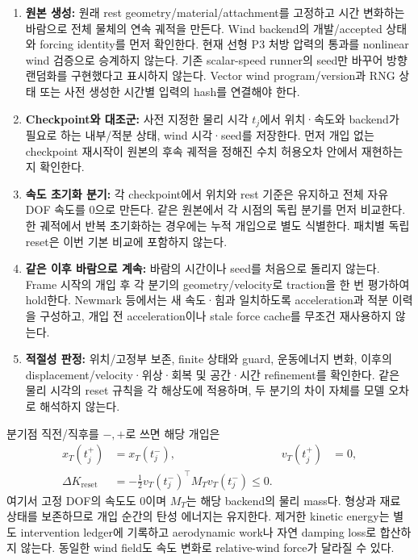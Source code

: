 \documentclass[10pt]{article}
\begin{document}
\begin{enumerate}
 \item \textbf{원본 생성:} 원래 rest geometry/material/attachment를 고정하고 시간 변화하는 바람으로
 전체 물체의 연속 궤적을 만든다. Wind backend의 개발/accepted 상태와 forcing identity를 먼저 확인한다.
현재 선형 P3 처방 압력의 통과를 nonlinear wind 검증으로 승계하지 않는다.
 기존 scalar-speed runner의 seed만 바꾸어 방향 랜덤화를 구현했다고 표시하지 않는다.
 Vector wind program/version과 RNG 상태 또는 사전 생성한 시간별 입력의 hash를 연결해야 한다.
 \item \textbf{Checkpoint와 대조군:} 사전 지정한 물리 시각 \(t_j\)에서 위치·속도와 backend가 필요로 하는
 내부/적분 상태, wind 시각·seed를 저장한다. 먼저 개입 없는 checkpoint 재시작이 원본의 후속 궤적을
 정해진 수치 허용오차 안에서 재현하는지 확인한다.
 \item \textbf{속도 초기화 분기:} 각 checkpoint에서 위치와 rest 기준은 유지하고 전체 자유 DOF 속도를
 0으로 만든다. 같은 원본에서 각 시점의 독립 분기를 먼저 비교한다. 한 궤적에서 반복 초기화하는 경우에는
 누적 개입으로 별도 식별한다. 패치별 독립 reset은 이번 기본 비교에 포함하지 않는다.
 \item \textbf{같은 이후 바람으로 계속:} 바람의 시간이나 seed를 처음으로 돌리지 않는다.
 Frame 시작의 개입 후 각 분기의 geometry/velocity로 traction을 한 번 평가하여 hold한다.
 Newmark 등에서는 새 속도·힘과 일치하도록 acceleration과 적분 이력을 구성하고,
 개입 전 acceleration이나 stale force cache를 무조건 재사용하지 않는다.
 \item \textbf{적절성 판정:} 위치/고정부 보존, finite 상태와 guard, 운동에너지 변화,
 이후의 displacement/velocity·위상·회복 및 공간·시간 refinement를 확인한다.
 같은 물리 시각의 reset 규칙을 각 해상도에 적용하며, 두 분기의 차이 자체를 모델 오차로 해석하지 않는다.
\end{enumerate}

분기점 직전/직후를 \(-,+\)로 쓰면 해당 개입은
\begin{equation}
 \begin{aligned}
  x_T(t_j^+)&=x_T(t_j^-), & v_T(t_j^+)&=0,\\
  \Delta K_{\mathrm{reset}}
    &=-\tfrac12 v_T(t_j^-)^\top M_Tv_T(t_j^-)\leq 0 .
 \end{aligned}
 \label{eq:r1-velocity-reset}
\end{equation}
여기서 고정 DOF의 속도도 0이며 \(M_T\)는 해당 backend의 물리 mass다.
형상과 재료 상태를 보존하므로 개입 순간의 탄성 에너지는 유지한다.
제거한 kinetic energy는 별도 intervention ledger에 기록하고 aerodynamic work나 자연 damping loss로
합산하지 않는다. 동일한 wind field도 속도 변화로 relative-wind force가 달라질 수 있다.
\end{document}
